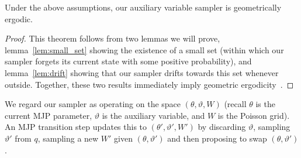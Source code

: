 \begin{theorem}
Under the above assumptions, our auxiliary variable sampler is
geometrically ergodic.  \label{thm:geom_erg}
\end{theorem}
\begin{proof}
\noindent This theorem follows from two lemmas we will prove,
lemma~\ref{lem:small_set} showing the existence of a small set (within
which our sampler forgets its
current state with some positive probability), and lemma~\ref{lem:drift}
showing that our sampler drifts towards this set whenever
outside. Together, these two results immediately imply geometric
ergodicity~\citep[Theorems 15.0.1 and Lemma 15.2.8]{meyn2009}.
\end{proof}
We regard our sampler as operating on the space $(\theta,\vartheta,W)$
(recall $\theta$ is the current MJP parameter, $\vartheta$ is the
auxiliary variable, and $W$ is the Poisson grid). An MJP transition step
updates this to $(\theta',\vartheta',W')$ by discarding $\vartheta$, 
sampling $\vartheta'$ from $q$, sampling a new $W'$ given 
$(\theta,\vartheta')$ and then proposing to swap $(\theta,\vartheta')$.

